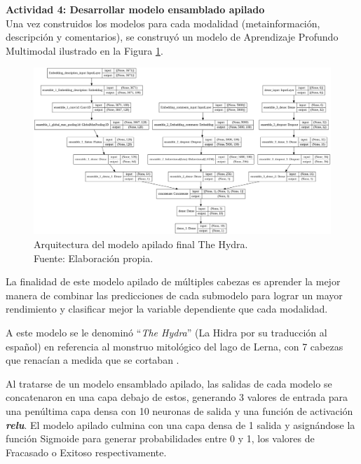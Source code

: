 \begin{landscape}
	\textbf{Actividad 4: Desarrollar modelo ensamblado apilado}
	\\
	Una vez construidos los modelos para cada modalidad (metainformación, descripción y comentarios), se construyó un modelo de Aprendizaje Profundo Multimodal ilustrado en la Figura \ref{4:fig37}.
	
	\begin{figure}[!ht]
		\begin{center}
			\includegraphics[width=1.20\textwidth]{4/figures/final_stacked_model.png}
			\caption[Arquitectura del modelo apilado final The Hydra]{Arquitectura del modelo apilado final The Hydra.\\
				Fuente: Elaboración propia.}
			\label{4:fig37}
		\end{center}
	\end{figure}
	
\end{landscape}

La finalidad de este modelo apilado de múltiples cabezas es aprender la mejor manera de combinar las predicciones de cada submodelo para lograr un mayor rendimiento y clasificar mejor la variable dependiente que cada modalidad.

A este modelo se le denominó “\textit{The Hydra}” (La Hidra por su traducción al español) en referencia al monstruo mitológico del lago de Lerna, con 7 cabezas que renacían a medida que se cortaban \parencite{ot_rae_hidra}.

Al tratarse de un modelo ensamblado apilado, las salidas de cada modelo se concatenaron en una capa debajo de estos, generando 3 valores de entrada para una penúltima capa densa con 10 neuronas de salida y una función de activación \textit{\textbf{relu}}. El modelo apilado culmina con una capa densa de 1 salida y asignándose la función Sigmoide para generar probabilidades entre 0 y 1, los valores de Fracasado o Exitoso respectivamente.

